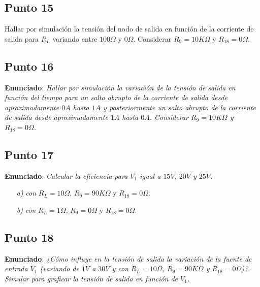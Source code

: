 \clearpage

\subsection{Punto 15}

Hallar por simulación la tensión del nodo de salida en función de la corriente de salida para  $R_{L}$ variando entre  $100 \Omega$ y $0 \Omega$. Considerar $R_{9} = 10 K\Omega$ y $R_{18} = 0 \Omega$.

\clearpage

\subsection{Punto 16}

\textbf{Enunciado}: \textsl{Hallar por simulación la variación de la tensión de salida en función del tiempo para un salto abrupto de la corriente de salida desde aproximadamente $0 A$ hasta $ 1A$ y posteriormente un salto abrupto de la corriente de salida desde aproximadamente $ 1A$ hasta $0 A$. Considerar $R_{9} = 10 K\Omega$ y $R_{18} = 0 \Omega$.}



\subsection{Punto 17}

\textbf{Enunciado}: \textsl{Calcular la eficiencia para $V_{1}$ igual a $15 V$, $20 V$ y $25 V$.}

\begin{enumerate}
\item[\textsl{a)}] \textsl{con} $R_{L} = 10 \Omega$, $R_{9} = 90 K\Omega$ y $R_{18} = 0 \Omega$.
\item[\textsl{b)}] \textsl{con} $R_{L} = 1 \Omega$, $R_{9} = 0 \Omega$ y $R_{18} = 0 \Omega$.
\end{enumerate}




\subsection{Punto 18}

\textbf{Enunciado}: \textsl{¿Cómo influye en la tensión de salida la variación de la fuente de entrada $V_{1}$ (variando de $1 V$ a $30 V$ y con $R_{L} = 10 \Omega$, $R_{9} = 90 K\Omega$ y $R_{18} = 0 \Omega$)?. Simular para graficar la tensión de salida en función de $V_{1}$.}\\


